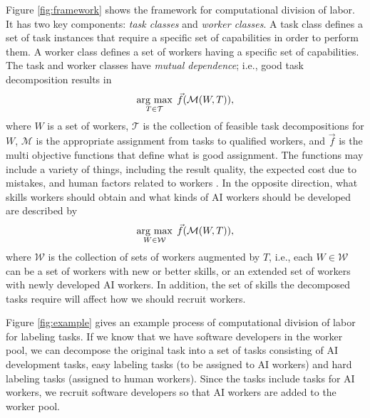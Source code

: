 Figure \ref{fig:framework} shows the framework for computational division of labor.
It has two key components: {\it task classes} and {\it worker classes}. 
A task class defines a set of task instances that require a specific set of capabilities in order to perform them.
A worker class defines a set of workers having a specific set of capabilities.
The task and worker classes have {\it mutual dependence};
i.e., good task decomposition results in
\[
\mathop{\rm arg~max}\limits_{T \in \mathcal{T}}\; \vec{f}(\mathcal{M}(W,T)),
\]
where $W$ is a set of workers, $\mathcal{T}$ is the collection of feasible task decompositions for $W$, $\mathcal{M}$ is the appropriate assignment from tasks to qualified workers, 
and $\vec{f}$ is the multi objective functions that define what is good assignment.
The functions may include a variety of things, including the result quality,  the expected cost due to mistakes, and human factors related to workers \cite{AR16}.
In the opposite direction, what skills workers should obtain and what kinds of AI workers should be developed are described by  
\[
\mathop{\rm arg~max}\limits_{W \in \mathcal{W}}\; \vec{f}(\mathcal{M}(W,T)),
\]
where $\mathcal{W}$ is the collection of sets of workers augmented by $T$, i.e., each $W \in \mathcal{W}$ can be a set of workers with new or better skills, or an extended set of workers with newly developed AI workers.
In addition, the set of skills the decomposed tasks require will affect 
how we should recruit workers.

Figure \ref{fig:example} gives an example process of computational division of labor for labeling tasks.
If we know that  we have software developers in the worker pool, we can decompose the original task into a set of tasks consisting of AI development tasks, easy labeling tasks (to be assigned to AI workers) and hard labeling tasks (assigned to human workers). Since the tasks include tasks for AI workers, we recruit software developers so that AI workers are added to the worker pool.

